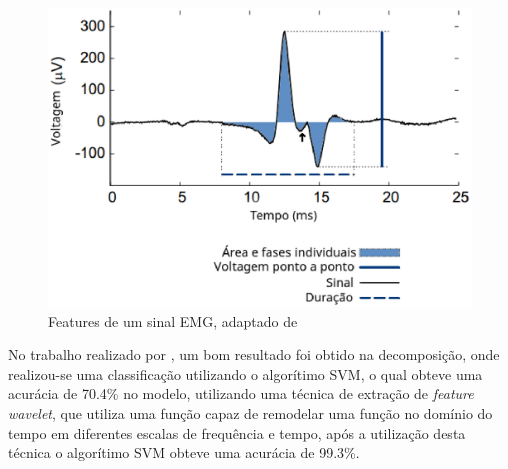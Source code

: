 \begin{figure}[!htb]
    \centering
     \includegraphics[width=1\textwidth]{figuras/featuresEMG.eps}
     \caption{Features de um sinal EMG, adaptado de }
     \label{featuresEMG}
 \end{figure}
 

No trabalho realizado por , um bom resultado foi obtido na decomposição, onde realizou-se uma classificação utilizando o algorítimo SVM, o qual obteve uma acurácia de 70.4\% no modelo, utilizando uma técnica de extração de \textit{feature} \textit{wavelet}, que utiliza uma função capaz de remodelar uma função no domínio do tempo em diferentes escalas de frequência e tempo, após a utilização desta técnica o algorítimo SVM obteve uma acurácia de 99.3\%.
